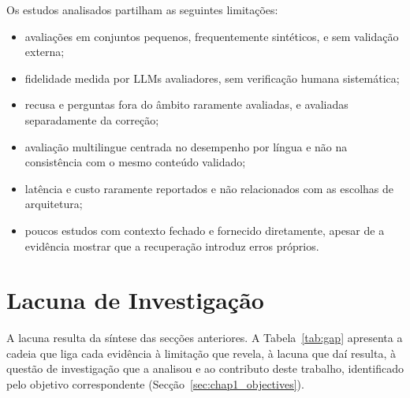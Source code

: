 Os estudos analisados partilham as seguintes limitações:
\begin{itemize}
    \item avaliações em conjuntos pequenos, frequentemente sintéticos, e sem validação externa;
    \item fidelidade medida por \glspl{LLM} avaliadores, sem verificação humana sistemática;
    \item recusa e perguntas fora do âmbito raramente avaliadas, e avaliadas separadamente da correção;
    \item avaliação multilingue centrada no desempenho por língua e não na consistência com o mesmo conteúdo validado;
    \item latência e custo raramente reportados e não relacionados com as escolhas de arquitetura;
    \item poucos estudos com contexto fechado e fornecido diretamente, apesar de a evidência mostrar que a recuperação introduz erros próprios.
\end{itemize}

\section{Lacuna de Investigação}
\label{sec:chap2_gap}

A lacuna resulta da síntese das secções anteriores. A Tabela~\ref{tab:gap} apresenta a cadeia que liga cada evidência à limitação que revela, à lacuna que daí resulta, à questão de investigação que a analisou e ao contributo deste trabalho, identificado pelo objetivo correspondente (Secção~\ref{sec:chap1_objectives}).

